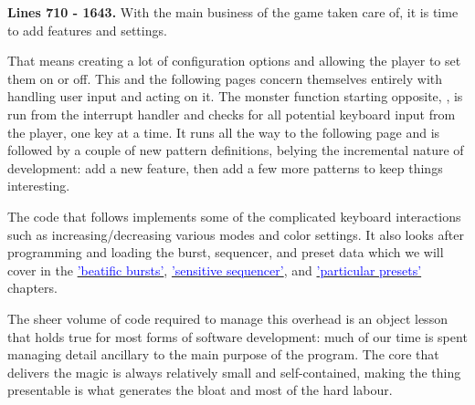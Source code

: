 \clearpage
{}
\textbf{Lines 710 - 1643.} With the main business of the game taken care of, it is time to add features and settings.

That means creating a lot of configuration options and allowing the player to set them on or off. This and the following
pages concern themselves entirely with handling user input and acting on it. The monster function starting opposite,
, is run from the interrupt handler and checks for all potential keyboard input from the player,
one key at a time. It runs all the way to the following page and is followed by a couple of new pattern definitions, belying
the incremental nature of development: add a new feature, then add a few more patterns to keep things interesting.

The code that follows implements some of the complicated keyboard interactions such as increasing/decreasing various modes
and color settings. It also looks after programming and loading the burst, sequencer, and preset data which we will cover in the
\hyperref[sec:bursts]{\textcolor{blue}{'beatific bursts'}},
\hyperref[sec:sequencer]{\textcolor{blue}{'sensitive sequencer'}}, and
\hyperref[sec:presets]{\textcolor{blue}{'particular presets'}} chapters.

The sheer volume of code required to manage this overhead is an object lesson that holds true for most forms of software development:
much of our time is spent managing detail ancillary to the main purpose of the program. The core that delivers the magic is always
relatively small and self-contained, making the thing presentable is what generates the bloat and most of the hard labour.

